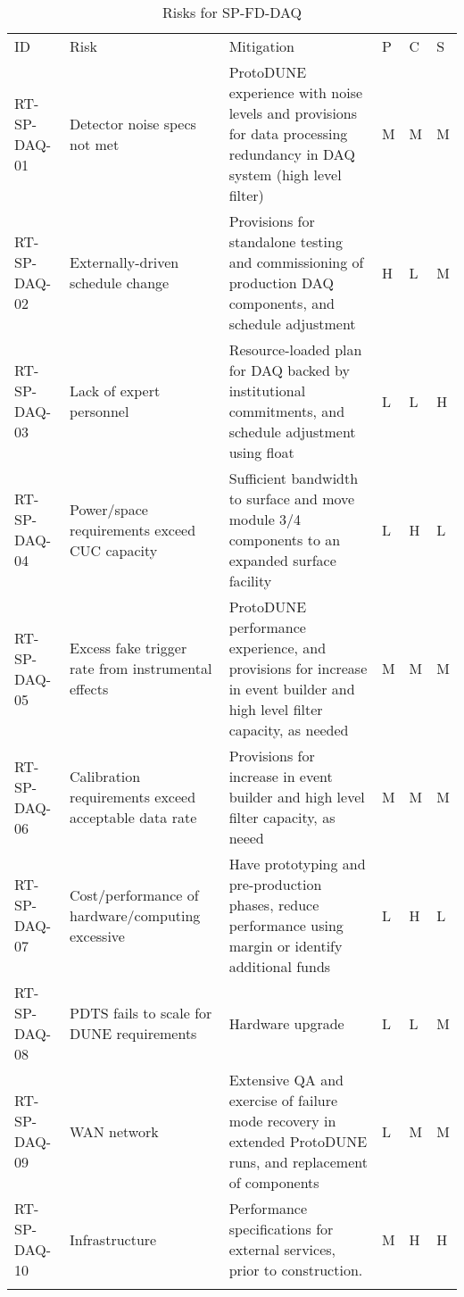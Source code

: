 
\begin{longtable}{p{}p{}p{}p{}p{}p{}} 
\caption{Risks for SP-FD-DAQ } \\
\rowcolor{dunesky}
ID & Risk & Mitigation & P & C & S  \\  \colhline
RT-SP-DAQ-01 & Detector noise specs not met & ProtoDUNE experience with noise levels and provisions for data processing redundancy in DAQ system (high level filter) & M & M & M \\  \colhline
RT-SP-DAQ-02 & Externally-driven schedule change & Provisions for standalone testing and commissioning of production DAQ components, and schedule adjustment & H & L & M \\  \colhline
RT-SP-DAQ-03 & Lack of expert personnel & Resource-loaded plan for DAQ backed by institutional commitments, and schedule adjustment using float & L & L & H \\  \colhline
RT-SP-DAQ-04 & Power/space requirements exceed CUC capacity & Sufficient bandwidth to surface and move module 3/4 components to an expanded surface facility & L & H & L \\  \colhline
RT-SP-DAQ-05 & Excess fake trigger rate from instrumental effects & ProtoDUNE performance experience, and provisions for increase in event builder and high level filter capacity, as needed & M & M & M \\  \colhline
RT-SP-DAQ-06 & Calibration requirements exceed acceptable data rate & Provisions for increase in event builder and high level filter capacity, as neeed & M & M & M \\  \colhline
RT-SP-DAQ-07 & Cost/performance of hardware/computing excessive & Have prototyping and pre-production phases, reduce performance using margin or identify additional funds & L & H & L \\  \colhline
RT-SP-DAQ-08 & PDTS fails to scale for DUNE requirements & Hardware upgrade & L & L & M \\  \colhline
RT-SP-DAQ-09 & WAN network & Extensive QA and exercise of failure mode recovery in extended ProtoDUNE runs, and replacement of components & L & M & M \\  \colhline
RT-SP-DAQ-10 & Infrastructure & Performance specifications for external services, prior to construction. & M & H & H \\  \colhline

\label{tab:risks:SP-FD-DAQ}
\end{longtable}